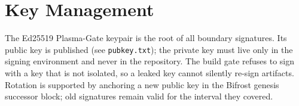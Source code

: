 \section{Key Management}
\label{sec:sec-keys}

The Ed25519 Plasma-Gate keypair is the root of all boundary signatures.
Its public key is published (see \texttt{pubkey.txt}); the private key
must live only in the signing environment and never in the repository. The
build gate refuses to sign with a key that is not isolated, so a leaked
key cannot silently re-sign artifacts. Rotation is supported by anchoring
a new public key in the Bifrost genesis successor block; old signatures
remain valid for the interval they covered.
